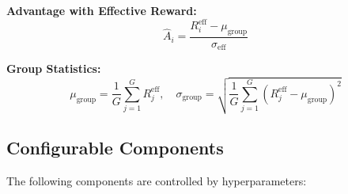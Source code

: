 \documentclass[11pt,a4paper]{article}
\begin{document}
\textbf{Advantage with Effective Reward:}
\begin{equation}
\hat{A}_{i} = \frac{R_i^{\text{eff}} - \mu_{\text{group}}}{\sigma_{\text{eff}}}
\end{equation}

\textbf{Group Statistics:}
\begin{equation}
\mu_{\text{group}} = \frac{1}{G}\sum_{j=1}^G R_j^{\text{eff}}, \quad \sigma_{\text{group}} = \sqrt{\frac{1}{G}\sum_{j=1}^G (R_j^{\text{eff}} - \mu_{\text{group}})^2}
\end{equation}

\subsection{Configurable Components}

The following components are controlled by hyperparameters:
\end{document}
